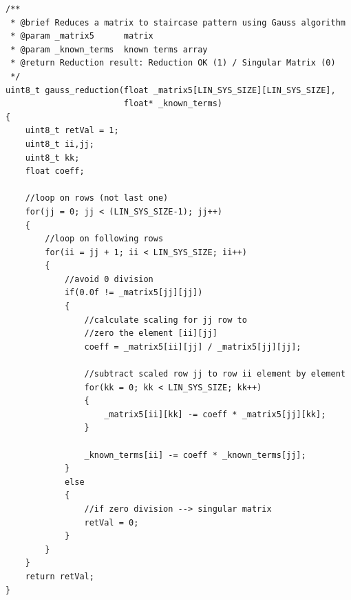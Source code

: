 \documentclass[main]{subfiles}
\begin{document}
\begin{minipage}[h]{\linewidth}
\begin{lstlisting}[caption=Gauss Reduction Implementation, label=CODE_GAUSS]
/**
 * @brief Reduces a matrix to staircase pattern using Gauss algorithm
 * @param _matrix5      matrix
 * @param _known_terms  known terms array
 * @return Reduction result: Reduction OK (1) / Singular Matrix (0)
 */
uint8_t gauss_reduction(float _matrix5[LIN_SYS_SIZE][LIN_SYS_SIZE], 
                        float* _known_terms)
{
    uint8_t retVal = 1;
    uint8_t ii,jj;
    uint8_t kk;
    float coeff;

    //loop on rows (not last one)
    for(jj = 0; jj < (LIN_SYS_SIZE-1); jj++)
    {
        //loop on following rows
        for(ii = jj + 1; ii < LIN_SYS_SIZE; ii++)
        {
            //avoid 0 division
            if(0.0f != _matrix5[jj][jj])
            {
                //calculate scaling for jj row to 
                //zero the element [ii][jj]
                coeff = _matrix5[ii][jj] / _matrix5[jj][jj];

                //subtract scaled row jj to row ii element by element
                for(kk = 0; kk < LIN_SYS_SIZE; kk++)
                {
                    _matrix5[ii][kk] -= coeff * _matrix5[jj][kk];
                }

                _known_terms[ii] -= coeff * _known_terms[jj];
            }
            else 
            {
                //if zero division --> singular matrix
                retVal = 0;
            }
        }
    }
    return retVal;
}
\end{lstlisting}
\end{minipage}
\end{document}
